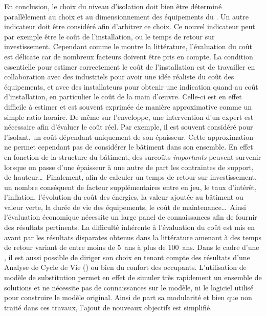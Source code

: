 En conclusion, le choix du niveau d’isolation doit bien être déterminé parallèlement au choix
et au dimensionnement des
équipements du . Un autre indicateur doit être considéré afin
d’arbitrer ce choix. Ce nouvel indicateur peut par exemple être le coût de l’installation, ou
le temps de retour sur investissement. Cependant comme le montre la littérature,
l’évaluation du coût est délicate car de nombreux facteurs doivent être pris en compte. La
condition essentielle pour estimer correctement le coût de l’installation est de
travailler en collaboration avec des industriels pour avoir une idée réaliste du coût des
équipements, et avec des installateurs pour obtenir une indication quand au coût
d’installation, en particulier le coût de la main d’œuvre. Celle-ci est en effet difficile
à estimer et est souvent exprimée de manière approximative comme un simple ratio horaire.
De même sur l’enveloppe, une intervention d’un expert est nécessaire afin d’évaluer le
coût réel. Par exemple, il est souvent considéré pour l’isolant, un coût dépendant
uniquement de son épaisseur. Cette approximation ne permet cependant pas de considérer le
bâtiment dans son ensemble. En effet en fonction de la structure du bâtiment, des surcoûts
\emph{importants} peuvent survenir lorsque on passe d’une épaisseur à une autre de part
les contraintes de support, de hauteur\dots\ Finalement, afin de calculer un
temps de retour sur investissement, un nombre conséquent de facteur supplémentaires entre en jeu, le
taux d’intérêt, l’inflation, l’évolution du coût des énergies, la valeur ajoutée au
bâtiment ou valeur verte, la durée de vie des équipements, le coût de maintenance\dots\
Ainsi l’évaluation économique nécessite un large panel de connaissances
afin de fournir des résultats pertinents.
La difficulté inhérente à l’évaluation du coût est mis en avant par les résultats
disparates obtenus dans la littérature amenant à des temps de retour variant de entre moins de
\SI{5}{ans} à plus de \SI{100}{ans}.
Dans le cadre d’une , il est aussi possible de diriger son choix en tenant
compte des résultats d’une Analyse de Cycle de Vie (\abr{ACV}) ou bien du confort des occupants.
L’utilisation de modèle de substitution permet en effet de simuler très rapidement
un ensemble de solutions et ne nécessite pas de connaissances sur le modèle, ni le
logiciel utilisé pour construire le modèle original. Ainsi de part sa modularité
et bien que non traité dans ces travaux, l’ajout de nouveaux objectifs est simplifié.

